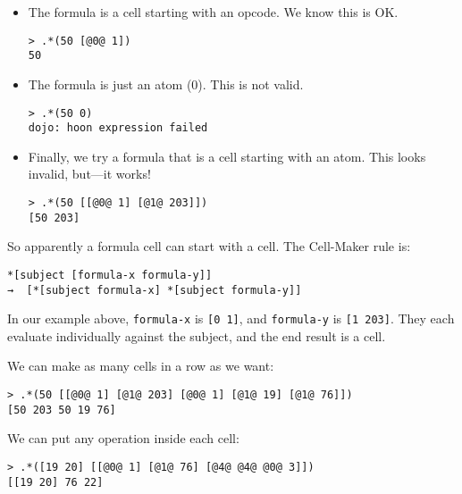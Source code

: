 \documentclass[twoside]{article}
\begin{document}
\begin{itemize}

  \item  The formula is a cell starting with an opcode.  We know this is OK.

\begin{lstlisting}[style=listingcode]
> .*(50 [@0@ 1])
50
\end{lstlisting}

  \item  The formula is just an atom (0).  This is not valid.

\begin{lstlisting}[style=listingcode]
> .*(50 0)
dojo: hoon expression failed
\end{lstlisting}

  \item  Finally, we try a formula that is a cell starting with an atom.  This looks invalid, but—it works!

\begin{lstlisting}[style=listingcode]
> .*(50 [[@0@ 1] [@1@ 203]])
[50 203]
\end{lstlisting}

\end{itemize}

So apparently a formula cell can start with a cell. The Cell-Maker rule is:

\begin{lstlisting}[style=listingcode]
*[subject [formula-x formula-y]]
→  [*[subject formula-x] *[subject formula-y]]
\end{lstlisting}

In our example above, \lstinline[style=inlinecode]{formula-x} is \lstinline[style=inlinecode]{[0 1]}, and \lstinline[style=inlinecode]{formula-y} is \lstinline[style=inlinecode]{[1 203]}. They each evaluate individually against the subject, and the end result is a cell.

We can make as many cells in a row as we want:

\begin{lstlisting}[style=listingcode]
> .*(50 [[@0@ 1] [@1@ 203] [@0@ 1] [@1@ 19] [@1@ 76]])
[50 203 50 19 76]
\end{lstlisting}

We can put any operation inside each cell:

\begin{lstlisting}[style=listingcode]
> .*([19 20] [[@0@ 1] [@1@ 76] [@4@ @4@ @0@ 3]])
[[19 20] 76 22]
\end{lstlisting}
\end{document}
